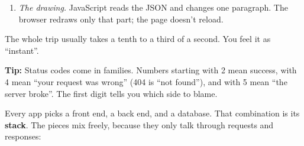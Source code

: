 \begin{enumerate}
\begin{codebox}[short]
  \end{codebox}

  \begin{codebox}[short]

\begin{Shaded}
\begin{Highlighting}[]

\end{Highlighting}
\end{Shaded}

  \end{codebox}

  The first line is the status. Then come headers, notes about the message. After the blank line comes the body: the handler's JSON.
\item
  \emph{The drawing.} JavaScript reads the JSON and changes one paragraph. The browser redraws only that part; the page doesn't reload.
\end{enumerate}

\noindent{}The whole trip usually takes a tenth to a third of a second. You feel it as ``instant''.

\begin{notebox}

\textbf{Tip:} Status codes come in families. Numbers starting with 2 mean success, with 4 mean ``your request was wrong'' (404 is ``not found''), and with 5 mean ``the server broke''. The first digit tells you which side to blame.

\end{notebox}

\label{webapp-04:common-stacks}

Every app picks a front end, a back end, and a database. That combination is its \textbf{stack}. The pieces mix freely, because they only talk through requests and responses:


